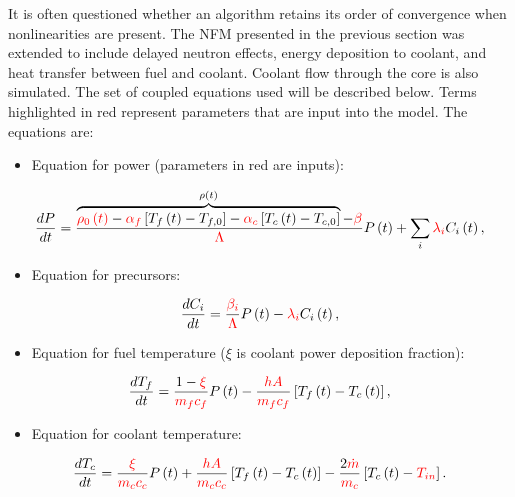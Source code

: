 \documentclass{ansconf}
\numberwithin{equation}{section}
\begin{document}

It is often questioned whether an algorithm retains its order of convergence when nonlinearities are present. The NFM presented in the previous section was extended to include delayed neutron effects, energy deposition to coolant, and heat transfer between fuel and coolant.  Coolant flow through the core is also simulated. The set of coupled equations used will be described below. Terms highlighted in {\color{red} red} represent parameters that are input into the model.  The equations are:
  \begin{itemize}
    \item Equation for power (parameters in {\color{red}red} are inputs):
  \end{itemize}
  \begin{equation}
    \frac{dP}{dt} = \frac{\overbrace{{\color{red}\rho_0\left(t\right)} - {\color{red}\alpha_f}\left[T_f\left(t\right) - T_{f,0}\right] - {\color{red}\alpha_c}\left[T_c\left(t\right) - 
    T_{c,0}\right]}^{\rho\left(t\right)} - {\color{red}{\beta}}}{{\color{red}\Lambda}}P\left(t\right) + \sum_i{\color{red}\lambda_i}C_i\left(t\right),
    \label{eq:pk_power}
  \end{equation}
    \begin{itemize}
    \item Equation for precursors:
  \end{itemize}
  \begin{equation}
    \frac{dC_i}{dt} = \frac{{\color{red}\beta_i}}{{\color{red}\Lambda}}P\left(t\right) - {\color{red}\lambda_i}C_i\left(t\right),
  \end{equation}
    \begin{itemize}
    \item Equation for fuel temperature ($\xi$ is coolant power deposition fraction):
  \end{itemize}
  \begin{equation}
    \frac{dT_f}{dt} = \frac{1-{\color{red}\xi}}{{\color{red}m_fc_f}}P\left(t\right) - \frac{\color{red}hA}{\color{red}m_fc_f}\left[T_f\left(t\right) - T_c\left(t\right)\right],
  \end{equation}
    \begin{itemize}
    \item Equation for coolant temperature:
  \end{itemize}
  \begin{equation}
    \frac{dT_c}{dt} = \frac{{\color{red}\xi}}{{\color{red}m_cc_c}}P\left(t\right) + \frac{\color{red}hA}{\color{red}m_cc_c}\left[T_f\left(t\right) - T_c\left(t\right)\right]
    - \frac{2\color{red}\dot{m}}{\color{red}m_c}\left[T_c\left(t\right) - {\color{red}T_{in}}\right].
    \label{eq:pk_temp}
  \end{equation}
\end{document}
